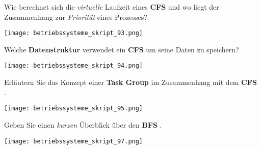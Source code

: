 \documentclass{article}
\begin{document}
\begin{tcolorbox}[colback=white!10!white,colframe=lightgray!75!black,
  savelowerto=\jobname_ex.tex]

\begin{center}
Wie berechnet sich die 
\textit{virtuelle
} Laufzeit eines 
\textbf{CFS
} und wo liegt der Zusammenhang zur 
\textit{Priorität
} eines Prozesses?

\end{center}

\tcblower

\justifying
\texttt{[image: betriebssysteme\_skript\_93.png]}

\end{tcolorbox}
\begin{tcolorbox}[colback=white!10!white,colframe=lightgray!75!black,
  savelowerto=\jobname_ex.tex]

\begin{center}
Welche 
\textbf{Datenstruktur
} verwendet ein 
\textbf{CFS
} um seine Daten zu speichern?

\end{center}

\tcblower

\justifying
\texttt{[image: betriebssysteme\_skript\_94.png]}

\end{tcolorbox}
\begin{tcolorbox}[colback=white!10!white,colframe=lightgray!75!black,
  savelowerto=\jobname_ex.tex]

\begin{center}
Erläutern Sie das Konzept einer 
\textbf{Task Group
} im Zusammenhang mit dem 
\textbf{CFS
}.

\end{center}

\tcblower

\justifying
\texttt{[image: betriebssysteme\_skript\_95.png]}

\end{tcolorbox}
\begin{tcolorbox}[colback=white!10!white,colframe=lightgray!75!black,
  savelowerto=\jobname_ex.tex]

\begin{center}
Geben Sie einen 
\textit{kurzen
} Überblick über den 
\textbf{BFS
}.

\end{center}

\tcblower

\justifying
\texttt{[image: betriebssysteme\_skript\_97.png]}

\end{tcolorbox}
\end{document}
